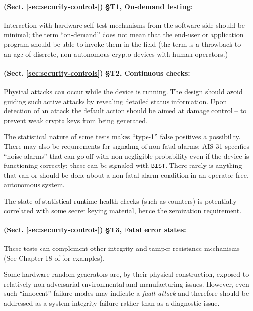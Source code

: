     \paragraph{(Sect. \ref{sec:security-controls}) \S T1, On-demand testing:}
    Interaction with hardware self-test mechanisms
    from the software side should be minimal; the term ``on-demand'' does not
    mean that the end-user or application program should be able to invoke
    them in the field (the term is a throwback to an age of discrete,
    non-autonomous crypto devices with human operators.)

    \paragraph{(Sect. \ref{sec:security-controls}) \S T2, Continuous checks:}
    Physical attacks can occur while the device is running. The design
    should avoid guiding such active attacks by revealing detailed
    status information. Upon detection of an attack the default action
    should be aimed at damage control -- to prevent weak crypto keys from
    being generated.

    The statistical nature of some tests makes ``type-1'' false
    positives a possibility. There may also be requirements for signaling
    of non-fatal alarms; AIS 31 specifies ``noise alarms'' that can go off
    with non-negligible probability even if the device is functioning
    correctly; these can be signaled with \verb|BIST|.
    There rarely is anything that can or should be done about a non-fatal
    alarm condition in an operator-free, autonomous system.

    The state of statistical runtime health checks (such as counters)
    is potentially correlated with some secret keying material, hence
    the zeroization requirement.

    \paragraph{(Sect. \ref{sec:security-controls}) \S T3, Fatal error states:}
    These tests can complement other integrity and tamper resistance
    mechanisms (See Chapter 18 of \cite{An20} for examples).

    Some hardware random generators are, by their physical construction,
    exposed to relatively non-adversarial environmental and manufacturing
    issues. However, even such  ``innocent'' failure modes may indicate
    a  \emph{fault attack} \cite{KaScVe13} and therefore should be addressed
    as a system integrity failure rather than as a diagnostic issue.

